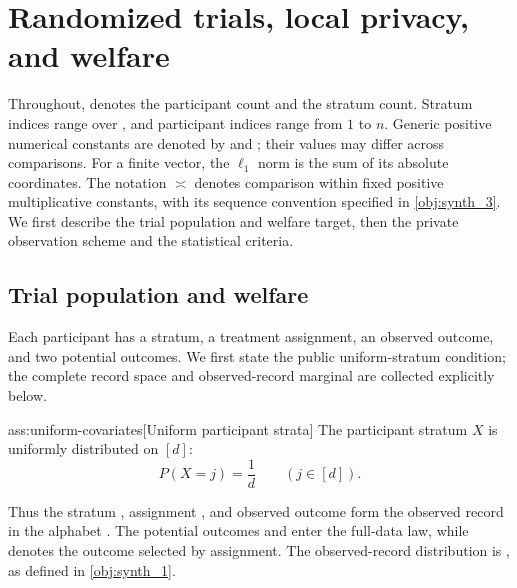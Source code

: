 \section{Randomized trials, local privacy, and welfare}

Throughout,  denotes the participant count and  the stratum count. Stratum indices range over , and participant indices range from \(1\) to \(n\). Generic positive numerical constants are denoted by  and ; their values may differ across comparisons. For a finite vector, the \(\ell_1\) norm is the sum of its absolute coordinates. The notation \(\asymp\) denotes comparison within fixed positive multiplicative constants, with its sequence convention specified in \cref{obj:synth_3}. We first describe the trial population and welfare target, then the private observation scheme and the statistical criteria.

\subsection{Trial population and welfare}

Each participant has a stratum, a treatment assignment, an observed outcome, and two potential outcomes. We first state the public uniform-stratum condition; the complete record space and observed-record marginal are collected explicitly below.

\begin{assumptionv}{ass:uniform-covariates}[Uniform participant strata]
The participant stratum \(X\) is uniformly distributed on \([d]\):
\[
P(X=j)=\frac{1}{d}\qquad(j\in[d]).
\]
\end{assumptionv}

Thus the stratum , assignment , and observed outcome  form the observed record  in the alphabet . The potential outcomes  and  enter the full-data law, while  denotes the outcome selected by assignment. The observed-record distribution is , as defined in \cref{obj:synth_1}.

